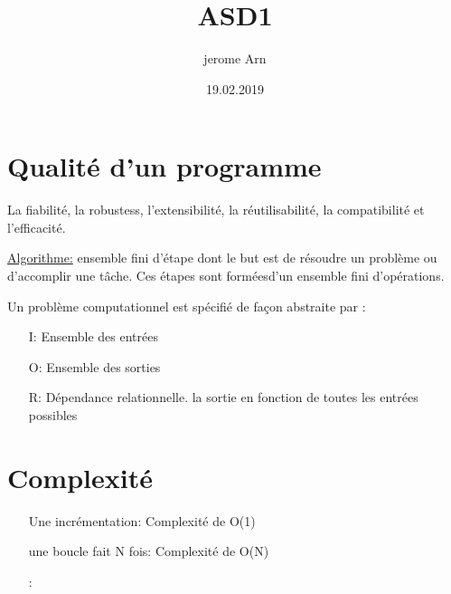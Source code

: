 \documentclass{article}
\title{ASD1}
\author{jerome Arn}
\date{19.02.2019}
\begin{document}
\maketitle
\newpage

\tableofcontents
\newpage

\section{Qualité d'un programme}
La fiabilité, la robustess, l'extensibilité, la réutilisabilité, la compatibilité et l'efficacité.

\uline{Algorithme:} ensemble fini d'étape dont le but est de résoudre un problème ou d'accomplir une tâche. Ces étapes sont forméesd'un ensemble fini d'opérations. 

\newline Un problème computationnel est spécifié de façon abstraite par :
\bigskip
\begin{itemize}
	\item[I:] Ensemble des entrées 
	\item[O:] Ensemble des sorties
    	\item[R:] Dépendance relationnelle. la sortie en fonction de toutes les entrées possibles
\end{itemize}
\bigskip

\section{Complexité}
\begin{itemize}
	\item[Une incrémentation:]Complexité de O(1)
	\item[une boucle fait N fois:] Complexité de O(N)
    	\item[:]
\end{itemize}
\bigskip
\end{document}
